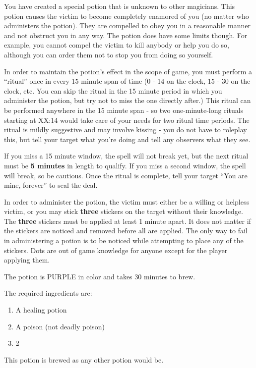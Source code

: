 \documentclass[green]{NeptuneBall}
\begin{document}
\name{\gLove{}}

You have created a special potion that is unknown to other magicians. This potion causes the victim to become completely enamored of you (no matter who administers the potion). They are compelled to obey you in a reasonable manner and not obstruct you in any way. The potion does have some limits though. For example, you cannot compel the victim to kill anybody or help you do so, although you can order them not to stop you from doing so yourself.

In order to maintain the potion's effect in the scope of game, you must perform a ``ritual'' once in every 15 minute span of time (0 - 14 on the clock, 15 - 30 on the clock, etc. You can skip the ritual in the 15 minute period in which you administer the potion, but try not to miss the one directly after.) This ritual can be performed anywhere in the 15 minute span - so two one-minute-long rituals starting at XX:14 would take care of your needs for two ritual time periods. The ritual is mildly suggestive and may involve kissing - you do not have to roleplay this, but tell your target what you're doing and tell any observers what they see.

If you miss a 15 minute window, the spell will not break yet, but the next ritual must be {\bf 5 minutes} in length to qualify. If you miss a second window, the spell will break, so be cautious. Once the ritual is complete, tell your target ``You are mine, forever'' to seal the deal.

In order to administer the potion, the victim must either be a willing or helpless victim, or you may stick {\bf three} stickers on the target without their knowledge. The {\bf three} stickers must be applied at least 1 minute apart. It does not matter if the stickers are noticed and removed before all are applied. The only way to fail in administering a potion is to be noticed while attempting to place any of the stickers. Dots are out of game knowledge for anyone except for the player applying them.

The potion is PURPLE in color and takes 30 minutes to brew.

The required ingredients are:
\begin{enumerate}
\item A healing potion 
\item A poison (not deadly poison)
\item 2 \iPearl{}
\end{enumerate}

This potion is brewed as any other potion would be.\\
\end{document}
